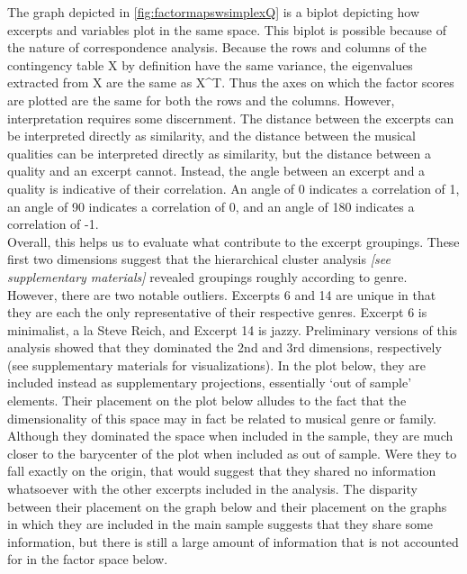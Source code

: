 \documentclass[
  english,
  man,floatsintext]{apa6}
\begin{document}
The graph depicted in \ref{fig:factormapswsimplexQ} is a biplot depicting how excerpts and variables plot in the same space. This biplot is possible because of the nature of correspondence analysis. Because the rows and columns of the contingency table X by definition have the same variance, the eigenvalues extracted from X are the same as X\^{}T. Thus the axes on which the factor scores are plotted are the same for both the rows and the columns. However, interpretation requires some discernment. The distance between the excerpts can be interpreted directly as similarity, and the distance between the musical qualities can be interpreted directly as similarity, but the distance between a quality and an excerpt cannot. Instead, the angle between an excerpt and a quality is indicative of their correlation. An angle of 0 indicates a correlation of 1, an angle of 90 indicates a correlation of 0, and an angle of 180 indicates a correlation of -1.\\
Overall, this helps us to evaluate what contribute to the excerpt groupings. These first two dimensions suggest that the hierarchical cluster analysis \emph{{[}see supplementary materials{]}} revealed groupings roughly according to genre. However, there are two notable outliers. Excerpts 6 and 14 are unique in that they are each the only representative of their respective genres. Excerpt 6 is minimalist, a la Steve Reich, and Excerpt 14 is jazzy. Preliminary versions of this analysis showed that they dominated the 2nd and 3rd dimensions, respectively (see supplementary materials for visualizations). In the plot below, they are included instead as supplementary projections, essentially `out of sample' elements. Their placement on the plot below alludes to the fact that the dimensionality of this space may in fact be related to musical genre or family. Although they dominated the space when included in the sample, they are much closer to the barycenter of the plot when included as out of sample. Were they to fall exactly on the origin, that would suggest that they shared no information whatsoever with the other excerpts included in the analysis. The disparity between their placement on the graph below and their placement on the graphs in which they are included in the main sample suggests that they share some information, but there is still a large amount of information that is not accounted for in the factor space below.\\
\end{document}
